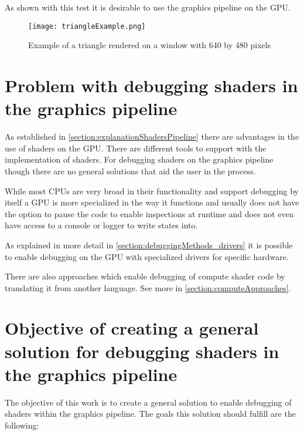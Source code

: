 As shown with this test it is desirable to use the graphics pipeline on the GPU.

\begin{figure}[h!]
  \centering 
  \texttt{[image: triangleExample.png]}
  \caption[Screenshot of triangle test render]{Example of a triangle rendered on a window with 640 by 480 pixels}
  \label{fig:triangleSample}
\end{figure}

\section{Problem with debugging shaders in the graphics pipeline}
\label{section:problems}

As established in \autoref{section:explanationShadersPipeline} there are advantages in the use of shaders on the GPU. There are different tools to support with the implementation of shaders. For debugging shaders on the graphics pipeline though there are no general solutions that aid the user in the process.

While most CPUs are very broad in their functionality and support debugging by itself a GPU is more specialized in the way it functions and usually does not have the option to pause the code to enable inspections at runtime and does not even have access to a console or logger to write states into.

As explained in more detail in \autoref{section:debuggingMethods_drivers} it is possible to enable debugging on the GPU with specialized drivers for specific hardware.

There are also approaches which enable debugging of compute shader code by translating it from another language. See more in \autoref{section:computeApproaches}.

\section{Objective of creating a general solution for debugging shaders in the graphics pipeline}
\label{paragraph:objective}

The objective of this work is to create a general solution to enable debugging of shaders within the graphics pipeline. The goals this solution should fulfill are the following:

